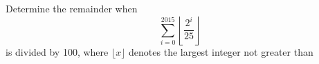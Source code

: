 Determine the remainder when
$$\sum_{i=0}^{2015} \left\lfloor \frac{2^i}{25} \right\rfloor$$is divided by 100, where $\lfloor x \rfloor$ denotes the largest integer not greater than 